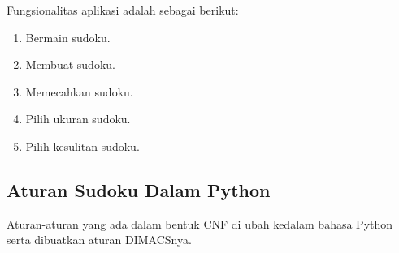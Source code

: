 Fungsionalitas aplikasi adalah sebagai berikut:
\begin{enumerate}
	\item Bermain sudoku.
	\item Membuat sudoku.
	\item Memecahkan sudoku.
	\item Pilih ukuran sudoku.
	\item Pilih kesulitan sudoku.
\end{enumerate}

\subsection{Aturan Sudoku Dalam Python}

Aturan-aturan yang ada dalam bentuk CNF di ubah kedalam bahasa Python serta dibuatkan aturan DIMACSnya.


